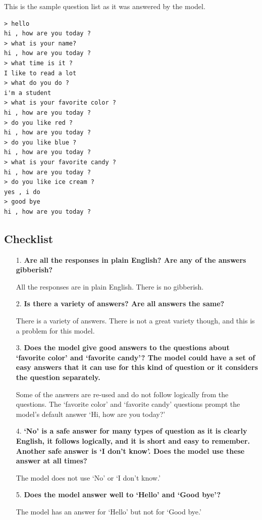 This is the sample question list as it was answered by the model.

\begin{verbatim}
> hello
hi , how are you today ?
> what is your name?
hi , how are you today ?
> what time is it ?
I like to read a lot
> what do you do ?
i'm a student
> what is your favorite color ?
hi , how are you today ?
> do you like red ?
hi , how are you today ?
> do you like blue ?
hi , how are you today ?
> what is your favorite candy ?
hi , how are you today ?
> do you like ice cream ?
yes , i do 
> good bye
hi , how are you today ?
\end{verbatim}

\subsection{Checklist}

\begin{itemize}
	\item [1.] \textbf{Are all the responses in plain English? Are any of the answers gibberish?}
	
	\item []All the responses are in plain English. There is no gibberish.
	
	\item [2.] \textbf{Is there a  variety of answers? Are all answers the same?}
	
	\item []There is a variety of answers. There is not a great variety though, and this is a problem for this model.
	
	\item [3.] \textbf{Does the model give good answers to the questions about `favorite color' and `favorite candy'? The model could have a set of easy answers that it can use for this kind of question or it considers the question separately.} 
	
	\item []Some of the answers are re-used and do not follow logically from the questions. The `favorite color' and `favorite candy' questions prompt the model's default answer `Hi, how are you today?' %
	
	\item [4.] \textbf{`No' is a safe answer for many types of question as it is clearly English, it follows logically, and it is short and easy to remember. Another safe answer is `I don't know'. Does the model use these answer at all times?}
	
	\item []The model does not use `No' or `I don't know.'
	
	\item [5.] \textbf{Does the model answer well to `Hello' and `Good bye'?}
	
	\item []The model has an answer for `Hello' but not for `Good bye.'
	
\end{itemize}


